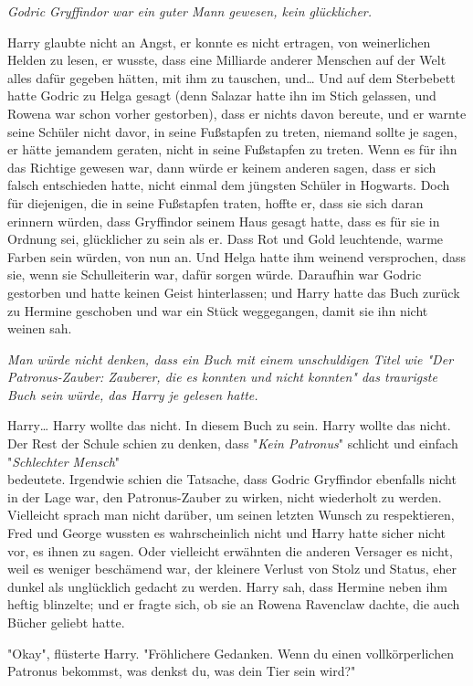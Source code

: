 {\emph{Godric Gryffindor war ein guter Mann gewesen, kein glücklicher.}

Harry glaubte nicht an Angst, er konnte es nicht ertragen, von weinerlichen Helden zu lesen, er wusste, dass eine Milliarde anderer Menschen auf der Welt alles dafür gegeben hätten, mit ihm zu tauschen, und… Und auf dem Sterbebett hatte Godric zu Helga gesagt (denn Salazar hatte ihn im Stich gelassen, und Rowena war schon vorher gestorben), dass er nichts davon bereute, und er warnte seine Schüler nicht davor, in seine Fußstapfen zu treten, niemand sollte je sagen, er hätte jemandem geraten, nicht in seine Fußstapfen zu treten. Wenn es für ihn das Richtige gewesen war, dann würde er keinem anderen sagen, dass er sich falsch entschieden hatte, nicht einmal dem jüngsten Schüler in Hogwarts. Doch für diejenigen, die in seine Fußstapfen traten, hoffte er, dass sie sich daran erinnern würden, dass Gryffindor seinem Haus gesagt hatte, dass es für sie in Ordnung sei, glücklicher zu sein als er. Dass Rot und Gold leuchtende, warme Farben sein würden, von nun an. Und Helga hatte ihm weinend versprochen, dass sie, wenn sie Schulleiterin war, dafür sorgen würde. Daraufhin war Godric gestorben und hatte keinen Geist hinterlassen; und Harry hatte das Buch zurück zu Hermine geschoben und war ein Stück weggegangen, damit sie ihn nicht weinen sah.

\emph{Man würde nicht denken, dass ein Buch mit einem unschuldigen Titel wie "Der Patronus-Zauber: Zauberer, die es konnten und nicht konnten" das traurigste Buch sein würde, das Harry je gelesen hatte.}

Harry… Harry wollte das nicht. In diesem Buch zu sein. Harry wollte das nicht. Der Rest der Schule schien zu denken, dass "\emph{Kein Patronus}" schlicht und einfach "\emph{Schlechter Mensch}"\\ bedeutete. Irgendwie schien die Tatsache, dass Godric Gryffindor ebenfalls nicht in der Lage war, den Patronus-Zauber zu wirken, nicht wiederholt zu werden. Vielleicht sprach man nicht darüber, um seinen letzten Wunsch zu respektieren, Fred und George wussten es wahrscheinlich nicht und Harry hatte sicher nicht vor, es ihnen zu sagen. Oder vielleicht erwähnten die anderen Versager es nicht, weil es weniger beschämend war, der kleinere Verlust von Stolz und Status, eher dunkel als unglücklich gedacht zu werden. Harry sah, dass Hermine neben ihm heftig blinzelte; und er fragte sich, ob sie an Rowena Ravenclaw dachte, die auch Bücher geliebt hatte.

"Okay", flüsterte Harry. "Fröhlichere Gedanken. Wenn du einen vollkörperlichen Patronus bekommst, was denkst du, was dein Tier sein wird?"

}
